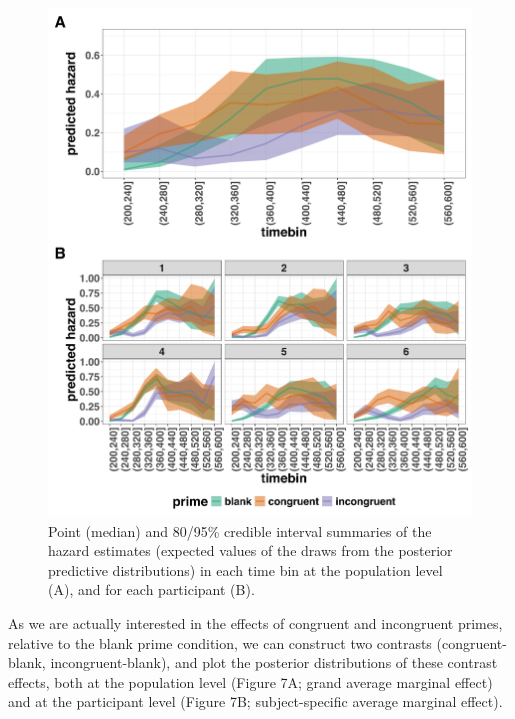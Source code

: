 \documentclass[
  man, donotrepeattitle,floatsintext]{apa6}
\begin{document}
\begin{figure}[H]

{\centering \includegraphics[width=0.8\linewidth,height=0.67\textheight,]{../Tutorial_2_Bayesian/figures/M1i_pred_combined} 

}

\caption{Point (median) and 80/95\% credible interval summaries of the hazard estimates (expected values of the draws from the posterior predictive distributions) in each time bin at the population level (A), and for each participant (B).}\label{fig:plot-pred-grand-effects}
\end{figure}

As we are actually interested in the effects of congruent and incongruent primes, relative to the blank prime condition, we can construct two contrasts (congruent-blank, incongruent-blank), and plot the posterior distributions of these contrast effects, both at the population level (Figure 7A; grand average marginal effect) and at the participant level (Figure 7B; subject-specific average marginal effect).
\end{document}
